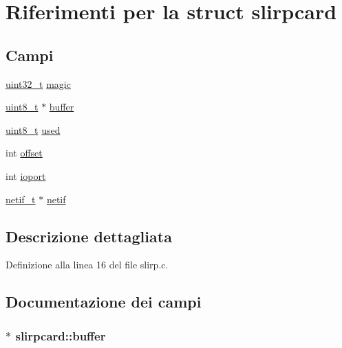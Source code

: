 \hypertarget{structslirpcard}{\section{Riferimenti per la struct slirpcard}
\label{structslirpcard}
}
\subsection*{Campi}
\begin{DoxyCompactItemize}
\item 
\hyperlink{aplus_8h_a53a0df51603c77c2aa5b9ea61b606a82}{uint32\+\_\+t} \hyperlink{structslirpcard_ab77a4a7b33ab2cd4a821aff9445cd134}{magic}
\item 
\hyperlink{aplus_8h_ae0430369c5a35dcdbc0bc19dcbb33a03}{uint8\+\_\+t} $\ast$ \hyperlink{structslirpcard_a3a9cd572ee740f4844706613f6c1a98d}{buffer}
\item 
\hyperlink{aplus_8h_ae0430369c5a35dcdbc0bc19dcbb33a03}{uint8\+\_\+t} \hyperlink{structslirpcard_aca0b3836ef213a9ab9cab689175d6a38}{used}
\item 
int \hyperlink{structslirpcard_adda6ed53672da7a5e56fd16007d704d0}{offset}
\item 
int \hyperlink{structslirpcard_aed1b09924afb61043cd93bed7edea389}{ioport}
\item 
\hyperlink{netif_8h_af6c73b8fa12396c0382f58d63e895008}{netif\+\_\+t} $\ast$ \hyperlink{structslirpcard_a4c84f5911831326cc979fe1c96c8607b}{netif}
\end{DoxyCompactItemize}


\subsection{Descrizione dettagliata}


Definizione alla linea 16 del file slirp.\+c.



\subsection{Documentazione dei campi}
\hypertarget{structslirpcard_a3a9cd572ee740f4844706613f6c1a98d}{
\subsubsection[{buffer}]{$\ast$ slirpcard\+::buffer}}\label{structslirpcard_a3a9cd572ee740f4844706613f6c1a98d}


